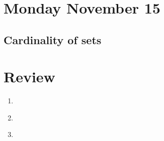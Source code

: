 \documentclass[12pt, oneside]{article}
\begin{document}

\section*{Monday November 15}






\newpage










\newpage


\subsection*{Cardinality of sets}


\newpage
\section*{Review}
\begin{enumerate}
    \item \hspace{1in}\\ 
    \item \hspace{1in}\\ 
    \newpage
    \item \hspace{1in}\\  
\end{enumerate}
\newpage
\end{document}
